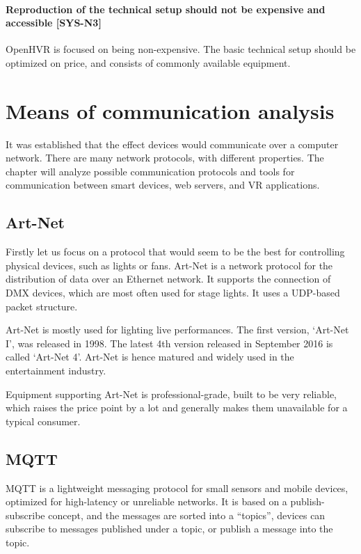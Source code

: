 \paragraph*{\textbf{Reproduction of the technical setup should not be expensive and accessible} [SYS-N3]}
OpenHVR is focused on being non-expensive. The basic technical setup should be
optimized on price, and consists of commonly available equipment.


\hypertarget{x-means-of-communication-analysis}{\section{Means of communication analysis}}
It was established that the effect devices would communicate over a computer network.
There are many network protocols, with different properties. The chapter will
analyze possible communication protocols and tools for communication
between smart devices, web servers, and VR applications.


\hypertarget{x-art-net}{\subsection{Art-Net}}
Firstly let us focus on a protocol that would seem to be the best for controlling
physical devices, such as lights or fans. Art-Net is a network protocol for
the distribution of data over an Ethernet network. It supports the connection of DMX
devices, which are most often used for stage lights. It uses a UDP-based packet
structure. \cite{artnet}

Art-Net is mostly used for lighting live performances. The first version,
`Art-Net I', was released in 1998. The latest 4th version released
in September 2016
is called `Art-Net 4'. Art-Net is hence matured and widely used in the
entertainment industry.

Equipment supporting Art-Net is professional-grade, 
built to be very reliable, which raises the price point
by a lot and generally makes them unavailable for a typical consumer.


\hypertarget{x-mqtt}{\subsection{MQTT}}
MQTT is a lightweight messaging protocol for small sensors and mobile devices,
optimized for high-latency or unreliable networks.  It is
based on a publish-subscribe concept, and the messages are sorted into a ``topics'',
devices can subscribe to messages published under a topic, or publish
a message into the topic.\cite{mqtthp}



